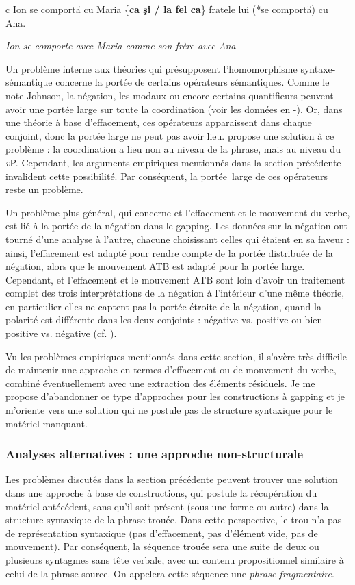   c  Ion se comportă cu Maria \{\textbf{ca şi / la fel ca}\} fratele lui (*se comportă) cu Ana.

{\itshape
Ion se comporte avec Maria comme son frère avec Ana}

Un problème interne aux théories qui présupposent l'homomorphisme syntaxe-sémantique concerne la portée de certains opérateurs sémantiques. Comme le note Johnson, la négation, les modaux ou encore certains quantifieurs peuvent avoir une portée large sur toute la coordination (voir les données en -). Or, dans une théorie à base d'effacement, ces opérateurs apparaissent dans chaque conjoint, donc la portée large ne peut pas avoir lieu. \citet{Coppock2001} propose une solution à ce problème : la coordination a lieu non au niveau de la phrase, mais au niveau du \textit{v}P. Cependant, les arguments empiriques mentionnés dans la section précédente invalident cette possibilité. Par conséquent, la portée~large de ces opérateurs reste un problème.

Un problème plus général, qui concerne et l'effacement et le mouvement du verbe, est lié à la portée de la négation dans le gapping. Les données sur la négation ont tourné d'une analyse à l'autre, chacune choisissant celles qui étaient en sa faveur : ainsi, l'effacement est adapté pour rendre compte de la portée distribuée de la négation, alors que le mouvement ATB est adapté pour la portée large. Cependant, et l'effacement et le mouvement ATB sont loin d'avoir un traitement complet des trois interprétations de la négation à l'intérieur d'une même théorie, en particulier elles ne captent pas la portée étroite de la négation, quand la polarité est différente dans les deux conjoints : négative vs. positive ou bien positive vs. négative (cf. \citet{Repp2009}).

Vu les problèmes empiriques mentionnés dans cette section, il s'avère très difficile de maintenir une approche en termes d'effacement ou de mouvement du verbe, combiné éventuellement avec une extraction des éléments résiduels. Je me propose d'abandonner ce type d'approches pour les constructions à gapping et je m'oriente vers une solution qui ne postule pas de structure syntaxique pour le matériel manquant. 

\subsubsection{Analyses alternatives : une approche non-structurale}
Les problèmes discutés dans la section précédente peuvent trouver une solution dans une approche à base de constructions, qui postule la récupération du matériel antécédent, sans qu'il soit présent (sous une forme ou autre) dans la structure syntaxique de la phrase trouée. Dans cette perspective, le trou n'a pas de représentation syntaxique (pas d'effacement, pas d'élément vide, pas de mouvement). Par conséquent, la séquence trouée sera une suite de deux ou plusieurs syntagmes sans tête verbale, avec un contenu propositionnel similaire à celui de la phrase source. On appelera cette séquence une \textit{phrase fragmentaire}.

